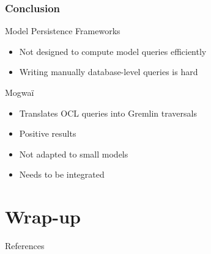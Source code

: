 \documentclass[10pt]{beamer}
\begin{document}
\begin{frame}[c]
\end{frame}

\begin{frame}[c]\frametitle{Conclusion}
	\begin{block}{Model Persistence Frameworks}
	  \begin{itemize}
		\item Not designed to compute model queries efficiently
		\item Writing manually database-level queries is hard
	  \end{itemize}
	\end{block}

  \begin{block}{Mogwaï}
		\begin{itemize}
		\item Translates OCL queries into Gremlin traversals
		\item Positive results
		\item Not adapted to small models
		\item Needs to be integrated
	  \end{itemize}
  \end{block}
\end{frame}

\section{Wrap-up}

\begin{frame}[allowframebreaks]{References}
  
  
\end{frame}
\end{document}

